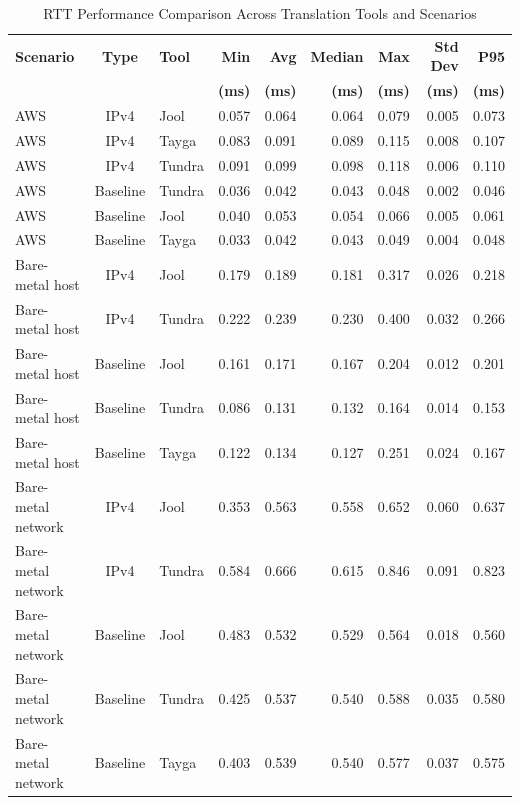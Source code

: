 \begin{table}[htbp]
\centering
\caption{RTT Performance Comparison Across Translation Tools and Scenarios}
\label{tab:rtt_comparison}
\footnotesize
\begin{tabular}{|l|c|l|r|r|r|r|r|r|}
\hline
\textbf{Scenario} & \textbf{Type} & \textbf{Tool} & \textbf{Min} & \textbf{Avg} & \textbf{Median} & \textbf{Max} & \textbf{Std Dev} & \textbf{P95}  \\
 & & & \textbf{(ms)} & \textbf{(ms)} & \textbf{(ms)} & \textbf{(ms)} & \textbf{(ms)} & \textbf{(ms)}  \\
\hline
AWS & IPv4 & Jool & 0.057 & 0.064 & 0.064 & 0.079 & 0.005 & 0.073   \\
AWS & IPv4 & Tayga & 0.083 & 0.091 & 0.089 & 0.115 & 0.008 & 0.107   \\
AWS & IPv4 & Tundra & 0.091 & 0.099 & 0.098 & 0.118 & 0.006 & 0.110   \\
AWS & Baseline & Tundra & 0.036 & 0.042 & 0.043 & 0.048 & 0.002 & 0.046   \\
AWS & Baseline & Jool & 0.040 & 0.053 & 0.054 & 0.066 & 0.005 & 0.061   \\
AWS & Baseline & Tayga & 0.033 & 0.042 & 0.043 & 0.049 & 0.004 & 0.048   \\
\hline
Bare-metal host & IPv4 & Jool & 0.179 & 0.189 & 0.181 & 0.317 & 0.026 & 0.218   \\
Bare-metal host & IPv4 & Tundra & 0.222 & 0.239 & 0.230 & 0.400 & 0.032 & 0.266   \\
Bare-metal host & Baseline & Jool & 0.161 & 0.171 & 0.167 & 0.204 & 0.012 & 0.201   \\
Bare-metal host & Baseline & Tundra & 0.086 & 0.131 & 0.132 & 0.164 & 0.014 & 0.153   \\
Bare-metal host & Baseline & Tayga & 0.122 & 0.134 & 0.127 & 0.251 & 0.024 & 0.167   \\
\hline
Bare-metal network & IPv4 & Jool & 0.353 & 0.563 & 0.558 & 0.652 & 0.060 & 0.637   \\
Bare-metal network & IPv4 & Tundra & 0.584 & 0.666 & 0.615 & 0.846 & 0.091 & 0.823   \\
Bare-metal network & Baseline & Jool & 0.483 & 0.532 & 0.529 & 0.564 & 0.018 & 0.560   \\
Bare-metal network & Baseline & Tundra & 0.425 & 0.537 & 0.540 & 0.588 & 0.035 & 0.580   \\
Bare-metal network & Baseline & Tayga & 0.403 & 0.539 & 0.540 & 0.577 & 0.037 & 0.575   \\
\hline
\end{tabular}
\end{table}

